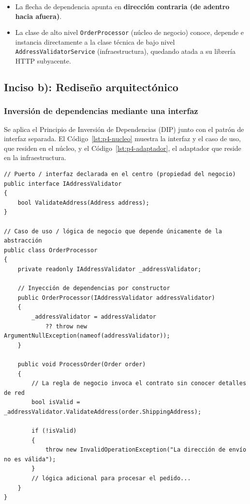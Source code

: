 \begin{itemize}
    \item La flecha de dependencia apunta en \textbf{dirección contraria (de adentro hacia afuera)}.
    \item La clase de alto nivel \texttt{OrderProcessor} (núcleo de negocio) conoce, depende e instancia directamente a la clase técnica de bajo nivel \texttt{AddressValidatorService} (infraestructura), quedando atada a su librería HTTP subyacente.
\end{itemize}

\subsection{Inciso b): Rediseño arquitectónico}

\subsubsection*{Inversión de dependencias mediante una interfaz}

Se aplica el Principio de Inversión de Dependencias (DIP) \parencite{martin2017} junto con el patrón de interfaz separada. El Código~\ref{lst:p4-nucleo} muestra la interfaz y el caso de uso, que residen en el núcleo, y el Código~\ref{lst:p4-adaptador}, el adaptador que reside en la infraestructura.

\begin{lstlisting}[caption={Interfaz \texttt{IAddressValidator} y clase \texttt{OrderProcessor} en el núcleo}, label=lst:p4-nucleo]
// Puerto / interfaz declarada en el centro (propiedad del negocio)
public interface IAddressValidator
{
    bool ValidateAddress(Address address);
}

// Caso de uso / lógica de negocio que depende únicamente de la abstracción
public class OrderProcessor
{
    private readonly IAddressValidator _addressValidator;

    // Inyección de dependencias por constructor
    public OrderProcessor(IAddressValidator addressValidator)
    {
        _addressValidator = addressValidator
            ?? throw new ArgumentNullException(nameof(addressValidator));
    }

    public void ProcessOrder(Order order)
    {
        // La regla de negocio invoca el contrato sin conocer detalles de red
        bool isValid = _addressValidator.ValidateAddress(order.ShippingAddress);

        if (!isValid)
        {
            throw new InvalidOperationException("La dirección de envío no es válida");
        }
        // lógica adicional para procesar el pedido...
    }
}
\end{lstlisting}

